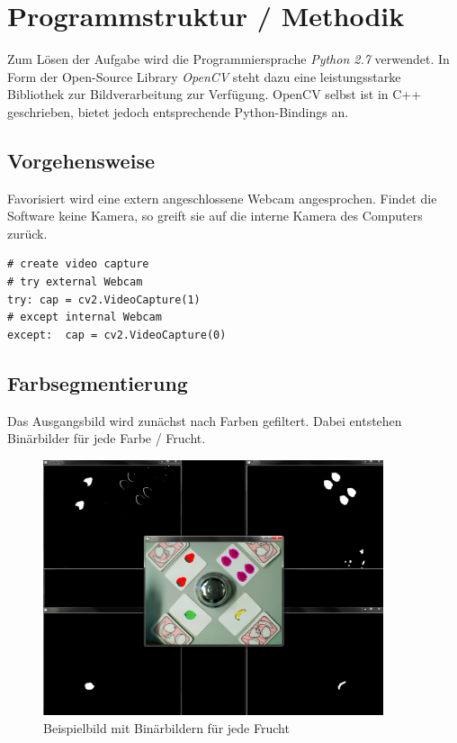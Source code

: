 
\section{Programmstruktur / Methodik}
\label{sec:Programmstruktur}

Zum Lösen der Aufgabe wird die Programmiersprache \emph{Python 2.7} verwendet. In Form der Open-Source Library \emph{OpenCV} steht dazu eine leistungsstarke Bibliothek zur Bildverarbeitung zur Verfügung.
OpenCV selbst ist in C++ geschrieben, bietet jedoch entsprechende Python-Bindings an.


\subsection{Vorgehensweise}

Favorisiert wird eine extern angeschlossene Webcam angesprochen. Findet die Software keine Kamera, so greift sie auf die interne Kamera des Computers zurück. %
\lstset{language=}
\begin{lstlisting}[]
# create video capture
# try external Webcam
try: cap = cv2.VideoCapture(1)
# except internal Webcam
except:  cap = cv2.VideoCapture(0)
\end{lstlisting}

\subsection{Farbsegmentierung}

Das Ausgangsbild wird zunächst nach Farben gefiltert. Dabei entstehen Binärbilder für jede Farbe / Frucht. 

\begin{figure}[h]
    \centering
    \includegraphics[width=10cm]{Abbildungen/Binaerbild01}
    \caption[Binär01]{Beispielbild mit Binärbildern für jede Frucht}
    \label{fig:Binär01}
\end{figure}


